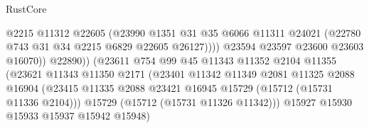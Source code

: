 \begin{lexlean}{RustCore}
\begin{coremodule}
                                                @2215
                                                @11312
                                                @22605
                                                (@23990
                                                  @1351
                                                  @31
                                                  @35
                                                  @6066
                                                  @11311
                                                  @24021
                                                  (@22780 @743 @31 @34 @2215 @6829 @22605 @26127))))
                                            @23594
                                            @23597
                                            @23600
                                            @23603
                                            @16070))
                                        @22890))
                                    (@23611
                                      @754
                                      @99
                                      @45
                                      @11343
                                      @11352
                                      @2104
                                      @11355
                                      (@23621
                                        @11343
                                        @11350
                                        @2171
                                        (@23401
                                          @11342
                                          @11349
                                          @2081
                                          @11325
                                          @2088
                                          @16904
                                          (@23415
                                            @11335
                                            @2088
                                            @23421
                                            @16945
                                            @15729
                                            (@15712 (@15731 @11336 @2104)))
                                          @15729
                                          (@15712 (@15731 @11326 @11342)))
                                        @15927
                                        @15930
                                        @15933
                                        @15937
                                        @15942
                                        @15948)

\end{coremodule}
\end{lexlean}
